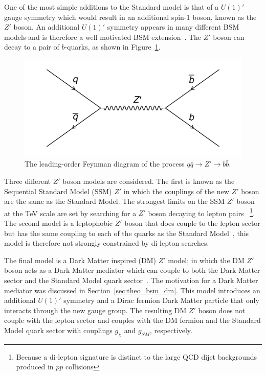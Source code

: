 One of the most simple additions to the Standard model is that of a $U(1)'$ gauge symmetry
which would result in an additional spin-1 boson, known as the $Z'$ boson.
An additional $U(1)'$ symmetry appears in many different BSM models and is therefore a well motivated BSM extension~\cite{theo-bsm_zprime}.
The $Z'$ boson can decay to a pair of $b$-quarks, as shown in Figure~\ref{fig:theo-bsm_zprime}.

\begin{figure}[!hbt]
  \begin{center}
    \includegraphics[width=0.7\linewidth, angle=0]{figs/Theory/bsm_zprime.png}
  \end{center}
  \caption{The leading-order Feynman diagram of the process $q\bar{q} \to Z' \to b\bar{b}$.}
  \label{fig:theo-bsm_zprime}
\end{figure}

Three different $Z'$ boson models are considered.
The first is known as the Sequential Standard Model (SSM) $Z'$ in which the couplings
of the new $Z'$ boson are the same as the Standard Model.
The strongest limits on the SSM $Z'$ boson at the TeV scale are set by searching for a $Z'$ boson decaying
to lepton pairs~\cite{theo-bsm_dilep} \footnote{Because a di-lepton signature is distinct to the large QCD dijet backgrounds produced in $pp$ collisions}.
The second model is a leptophobic $Z'$ boson that does couple to the lepton sector
but has the same coupling to each of the quarks as the Standard Model~\cite{theo-bsm_zprime_leptophobic},
this model is therefore not strongly constrained by di-lepton searches.

The final model is a Dark Matter inspired (DM) $Z'$ model;
in which the DM $Z'$ boson acts as a Dark Matter mediator which can couple to both the Dark Matter sector and the Standard Model quark sector~\cite{theo_bsm-zprime_dm}.
The motivation for a Dark Matter mediator was discussed in Section~\ref{sec:theo_bsm_dm}.
This model introduces an additional $U(1)'$ symmetry and a Dirac fermion Dark Matter particle that only interacts through the new gauge group.
The resulting DM $Z'$ boson does not couple with the lepton sector
and couples with the DM fermion and the Standard Model quark sector with couplings $g_\chi$\hspace{0.1mm} and $g_{SM}$\hspace{0.1mm}, respectively.

